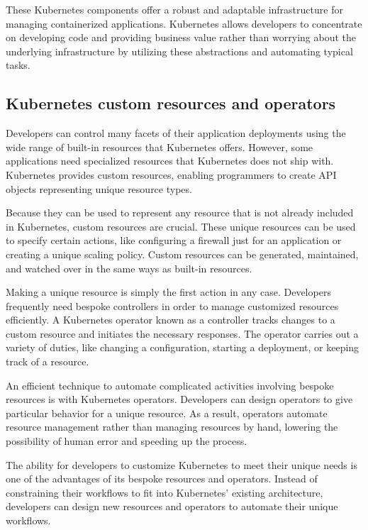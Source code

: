 These Kubernetes components offer a robust and adaptable infrastructure for managing containerized applications. Kubernetes allows developers to concentrate on developing code and providing business value rather than worrying about the underlying infrastructure by utilizing these abstractions and automating typical tasks.


\subsection{Kubernetes custom resources and operators}

Developers can control many facets of their application deployments using the wide range of built-in resources that Kubernetes offers. However, some applications need specialized resources that Kubernetes does not ship with. Kubernetes provides custom resources, enabling programmers to create API objects representing unique resource types.

Because they can be used to represent any resource that is not already included in Kubernetes, custom resources are crucial. These unique resources can be used to specify certain actions, like configuring a firewall just for an application or creating a unique scaling policy. Custom resources can be generated, maintained, and watched over in the same ways as built-in resources.

Making a unique resource is simply the first action in any case. Developers frequently need bespoke controllers in order to manage customized resources efficiently. A Kubernetes operator known as a controller tracks changes to a custom resource and initiates the necessary responses. The operator carries out a variety of duties, like changing a configuration, starting a deployment, or keeping track of a resource.

An efficient technique to automate complicated activities involving bespoke resources is with Kubernetes operators. Developers can design operators to give particular behavior for a unique resource. As a result, operators automate resource management rather than managing resources by hand, lowering the possibility of human error and speeding up the process.

The ability for developers to customize Kubernetes to meet their unique needs is one of the advantages of its bespoke resources and operators. Instead of constraining their workflows to fit into Kubernetes' existing architecture, developers can design new resources and operators to automate their unique workflows.

